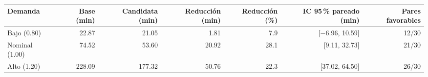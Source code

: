 \begin{tabular}{lrrrrrr}
\toprule
Demanda & Base (min) & Candidata (min) & Reducción (min) & Reducción (\%) & IC 95\,\% pareado (min) & Pares favorables \\
\midrule
Bajo (0.80) & 22.87 & 21.05 & 1.81 & 7.9 & [$-$6.96, 10.59] & 12/30 \\
Nominal (1.00) & 74.52 & 53.60 & 20.92 & 28.1 & [9.11, 32.73] & 21/30 \\
Alto (1.20) & 228.09 & 177.32 & 50.76 & 22.3 & [37.02, 64.50] & 26/30 \\
\bottomrule
\end{tabular}
